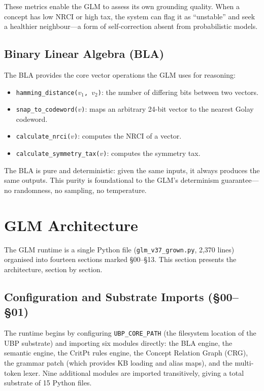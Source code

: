 \documentclass[11pt,a4paper]{article}
\begin{document}
These metrics enable the GLM to assess its own grounding quality. When a concept has low NRCI or high tax, the system can flag it as ``unstable'' and seek a healthier neighbour---a form of self-correction absent from probabilistic models.

\subsection{Binary Linear Algebra (BLA)}

The BLA provides the core vector operations the GLM uses for reasoning:

\begin{itemize}
    \item \texttt{hamming\_distance($v_1$, $v_2$)}: the number of differing bits between two vectors.
    \item \texttt{snap\_to\_codeword($v$)}: maps an arbitrary 24-bit vector to the nearest Golay codeword.
    \item \texttt{calculate\_nrci($v$)}: computes the NRCI of a vector.
    \item \texttt{calculate\_symmetry\_tax($v$)}: computes the symmetry tax.
\end{itemize}

The BLA is pure and deterministic: given the same inputs, it always produces the same outputs. This purity is foundational to the GLM's determinism guarantee---no randomness, no sampling, no temperature.

\section{GLM Architecture}
\label{sec:architecture}

The GLM runtime is a single Python file (\texttt{glm\_v37\_grown.py}, 2,370 lines) organised into fourteen sections marked \S00--\S13. This section presents the architecture, section by section.

\subsection{Configuration and Substrate Imports (\S00--\S01)}

The runtime begins by configuring \texttt{UBP\_CORE\_PATH} (the filesystem location of the UBP substrate) and importing six modules directly: the BLA engine, the semantic engine, the CritPt rules engine, the Concept Relation Graph (CRG), the grammar patch (which provides KB loading and alias maps), and the multi-token lexer. Nine additional modules are imported transitively, giving a total substrate of 15 Python files.
\end{document}
